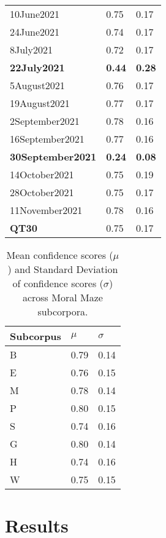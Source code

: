 \documentclass{article}
\begin{document}
\begin{table}[H]
\begin{tabular}{|l|ll|}
10June2021      & 0.75            & 0.17               \\
24June2021      & 0.74            & 0.17               \\
8July2021       & 0.72            & 0.17               \\
\textbf{22July2021}      & \textbf{0.44}   & \textbf{0.28}      \\
5August2021     & 0.76            & 0.17               \\
19August2021    & 0.77            & 0.17               \\
2September2021  & 0.78            & 0.16               \\
16September2021 & 0.77            & 0.16               \\
\textbf{30September2021} & \textbf{0.24}   & \textbf{0.08}      \\
14October2021   & 0.75            & 0.19               \\
28October2021   & 0.75            & 0.17               \\
11November2021  & 0.78            & 0.16               \\ \hline
\textbf{QT30}   & 0.75            & 0.17               \\ \hline
\end{tabular}
\end{table}

\begin{table}[H]
\centering
\caption{Mean confidence scores ($\mu$) and Standard Deviation of confidence scores ($\sigma$) across Moral Maze subcorpora. \label{tbl:moral-confidence}}
\begin{tabular}{|l|ll|}
\hline
Subcorpus & $\mu$ & $\sigma$ \\ \hline
B         & 0.79 & 0.14   \\
E         & 0.76 & 0.15   \\
M         & 0.78 & 0.14   \\
P         & 0.80 & 0.15   \\
S         & 0.74 & 0.16   \\
G         & 0.80 & 0.14   \\
H         & 0.74 & 0.16   \\
W         & 0.75 & 0.15   \\ \hline
\end{tabular}
\end{table}

\pagebreak
\section{Results}\label{app:results}
\end{document}
